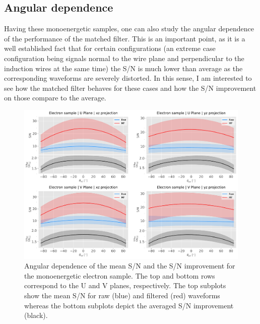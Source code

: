 \subsection{Angular dependence}
\label{subsec:2.5.1}

Having these monoenergetic samples, one can also study the angular dependence of the performance of the matched filter. This is an important point, as it is a well established fact that for certain configurations (an extreme case configuration being signals normal to the wire plane and perpendicular to the induction wires at the same time) the S/N is much lower than average as the corresponding waveforms are severely distorted. In this sense, I am interested to see how the matched filter behaves for these cases and how the S/N improvement on those compare to the average.

\begin{figure}[t]
	\centering
	\includegraphics[width=0.9\linewidth]{Images/Matched_Filter/larsoft_electron_angular.pdf}
	\caption[Angular dependence of the mean S/N and the S/N improvement for the monoenergetic electron sample.]{Angular dependence of the mean S/N and the S/N improvement for the monoenergetic electron sample. The top and bottom rows correspond to the U and V planes, respectively. The top subplots show the mean S/N for raw (blue) and filtered (red) waveforms whereas the bottom subplots depict the averaged S/N improvement (black).}
	\label{fig:angular_electron}
\end{figure}


